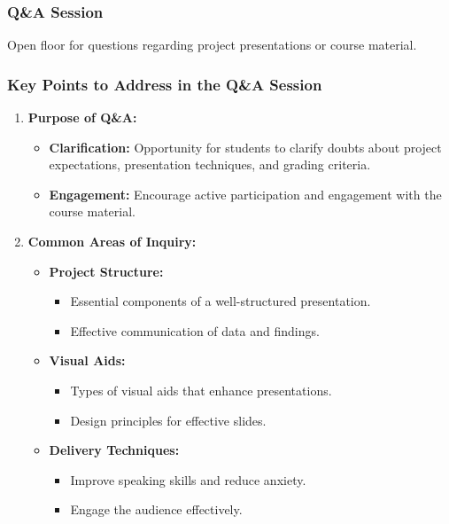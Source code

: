 \documentclass[aspectratio=169]{beamer}
\begin{document}
\begin{frame}[fragile]
    \frametitle{Q\&A Session}
    Open floor for questions regarding project presentations or course material.
\end{frame}

\begin{frame}[fragile]
    \frametitle{Key Points to Address in the Q\&A Session}
    \begin{enumerate}
        \item \textbf{Purpose of Q\&A:}
            \begin{itemize}
                \item \textbf{Clarification:} Opportunity for students to clarify doubts about project expectations, presentation techniques, and grading criteria.
                \item \textbf{Engagement:} Encourage active participation and engagement with the course material.
            \end{itemize}
        
        \item \textbf{Common Areas of Inquiry:}
            \begin{itemize}
                \item \textbf{Project Structure:}
                    \begin{itemize}
                        \item Essential components of a well-structured presentation.
                        \item Effective communication of data and findings.
                    \end{itemize}
                \item \textbf{Visual Aids:}
                    \begin{itemize}
                        \item Types of visual aids that enhance presentations.
                        \item Design principles for effective slides.
                    \end{itemize}
                \item \textbf{Delivery Techniques:}
                    \begin{itemize}
                        \item Improve speaking skills and reduce anxiety.
                        \item Engage the audience effectively.
                    \end{itemize}
            \end{itemize}
    \end{enumerate}
\end{frame}
\end{document}
